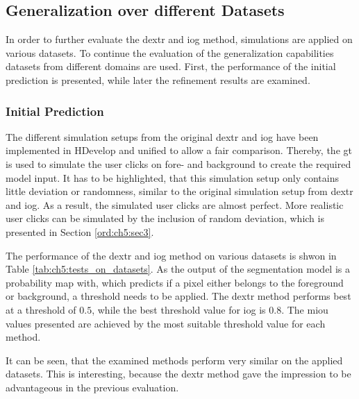\subsection{Generalization over different Datasets}

In order to further evaluate the \gls{dextr} and \gls{iog} method, simulations are applied on various datasets.
To continue the evaluation of the generalization capabilities datasets from different domains are used.
First, the performance of the initial prediction is presented, while later the refinement results are examined. 

\subsubsection{Initial Prediction}

The different simulation setups from the original \gls{dextr} \cite{Man18-DEXTR} and \gls{iog} \cite{Zha20-IOG} have been implemented in HDevelop and unified to allow a fair comparison. 
Thereby, the \gls{gt} is used to simulate the user clicks on fore- and background to create the required model input.
It has to be highlighted, that this simulation setup only contains little deviation or randomness, similar to the original simulation setup from \gls{dextr} and \gls{iog}.
As a result, the simulated user clicks are almost perfect.
More realistic user clicks can be simulated by the inclusion of random deviation, which is presented in Section \ref{ord:ch5:sec3}.

The performance of the \gls{dextr} and \gls{iog} method on various datasets is shwon in Table \ref{tab:ch5:tests_on_datasets}.
As the output of the segmentation model is a probability map with, which predicts if a pixel either belongs to the foreground or background, a threshold needs to be applied.
The \gls{dextr} method performs best at a threshold of $ 0.5 $, while the best threshold value for \gls{iog} is $ 0.8 $.
The \gls{miou} values presented are achieved by the most suitable threshold value for each method.

It can be seen, that the examined methods perform very similar on the applied datasets.
This is interesting, because the \gls{dextr} method gave the impression to be advantageous in the previous evaluation.

